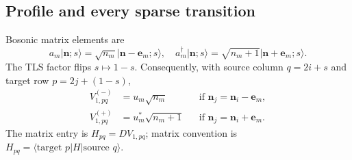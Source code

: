 \documentclass[11pt,a4paper]{article}
\newcommand{\ket}[1]{\lvert #1\rangle}
\newcommand{\bra}[1]{\langle #1\rvert}
\begin{document}
\subsection{Profile and every sparse transition}

Bosonic matrix elements are
\begin{equation}
a_m\ket{\mathbf n;s}=\sqrt{n_m}\ket{\mathbf n-\mathbf e_m;s},
\quad
a_m^\dagger\ket{\mathbf n;s}=\sqrt{n_m+1}\ket{\mathbf n+\mathbf e_m;s}.
\label{eq:boson}
\end{equation}
The TLS factor flips $s\mapsto1-s$. Consequently, with source column
$q=2i+s$ and target row $p=2j+(1-s)$,
\begin{align}
V_{1,pq}^{(-)}&=u_m\sqrt{n_m}
&&\text{if }\mathbf n_j=\mathbf n_i-\mathbf e_m,\label{eq:down}\\
V_{1,pq}^{(+)}&=u_m^*\sqrt{n_m+1}
&&\text{if }\mathbf n_j=\mathbf n_i+\mathbf e_m.\label{eq:up}
\end{align}
The matrix entry is $H_{pq}=D V_{1,pq}$; matrix convention is
$H_{pq}=\bra{\text{target }p}H\ket{\text{source }q}$.
\end{document}
